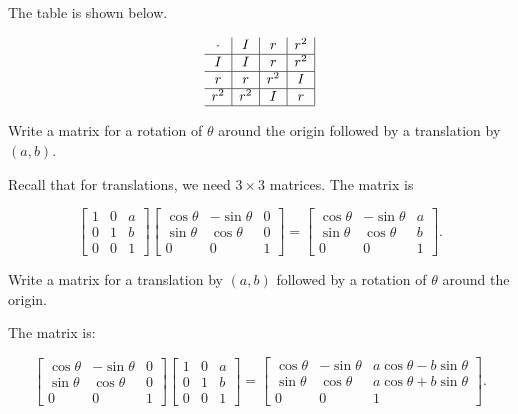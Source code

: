 \documentclass[../key.tex]{subfiles}
\begin{document}
The table is shown below.

$$\begin{array}{c|c|c|c|}
\cdot & I & r & r^2 \\ \hline
I & I & r & r^2 \\ \hline
r & r & r^2 & I \\ \hline
r^2 & r^2 & I & r \\ \hline
\end{array}$$

\begin{outer_problem}
\item
\end{outer_problem}

\begin{inner_problem}[start=1]
\item Write a matrix for a rotation of $\theta$ around the origin followed by a translation by $(a,b)$.
\end{inner_problem}

Recall that for translations, we need $3\times 3$ matrices. The matrix is

$$\begin{bmatrix}1 & 0 & a \\ 0 & 1 & b \\ 0 & 0 & 1 \end{bmatrix} \begin{bmatrix} \cos\theta & -\sin\theta & 0 \\ \sin\theta & \cos\theta & 0 \\ 0 & 0 & 1 \end{bmatrix} = \begin{bmatrix} \cos\theta & -\sin\theta & a \\ \sin\theta & \cos\theta & b \\ 0 & 0 & 1 \end{bmatrix}.$$

\begin{inner_problem}
\item Write a matrix for a translation by $(a,b)$ followed by a rotation of $\theta$ around the origin.
\end{inner_problem}

The matrix is:

$$\begin{bmatrix} \cos\theta & -\sin\theta & 0 \\ \sin\theta & \cos\theta & 0 \\ 0 & 0 & 1 \end{bmatrix} \begin{bmatrix}1 & 0 & a \\ 0 & 1 & b \\ 0 & 0 & 1 \end{bmatrix} = \begin{bmatrix} \cos\theta & -\sin\theta & a\cos\theta - b\sin\theta \\ \sin\theta & \cos\theta & a\cos\theta + b\sin\theta \\ 0 & 0 & 1 \end{bmatrix}.$$
\end{document}
